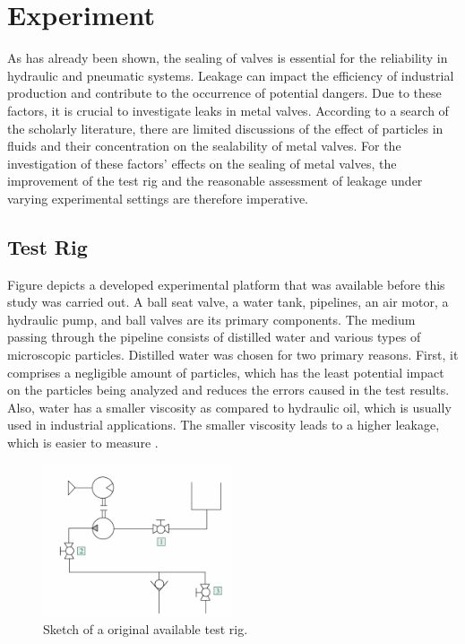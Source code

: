 \chapter{Experiment}
\label{ch:Experiment}
As has already been shown, the sealing of valves is essential for the reliability in hydraulic and pneumatic systems. Leakage can impact the efficiency
 of industrial production and contribute to the occurrence of potential dangers. 
Due to these factors, it is crucial to investigate leaks in metal valves. According to a search 
of the scholarly literature, there are limited discussions of the effect of particles in fluids 
and their concentration on the sealability of metal valves. For the investigation of these 
factors' effects on the sealing of metal valves, the improvement of the test rig and the 
reasonable assessment of leakage under varying experimental settings are therefore imperative.

\section{Test Rig}
\label{Test Rig}
Figure  depicts a developed experimental platform that was available before this study 
was carried out. A ball seat valve, a water tank, pipelines, an air motor, a hydraulic pump,
and ball valves are its primary components. The medium passing through the pipeline 
consists of distilled water and various types of microscopic particles. Distilled water
was chosen for two primary reasons. First, it comprises a negligible amount of particles,
which has the least potential impact on the particles being analyzed and reduces the 
errors caused in the test results. Also, water has a smaller viscosity as compared to
hydraulic oil, which is usually used in industrial applications. 
The smaller viscosity leads to a higher leakage, which is easier to measure \cite{fischer2021influence}.\\

\begin{figure}[htbp]
    \centering
    \includegraphics[width=0.5\textwidth]{figures/TestRig/TestRig1.jpg}
    \caption{Sketch of a original available test rig.}
    \label{fig:TestRig1}
\end{figure}

